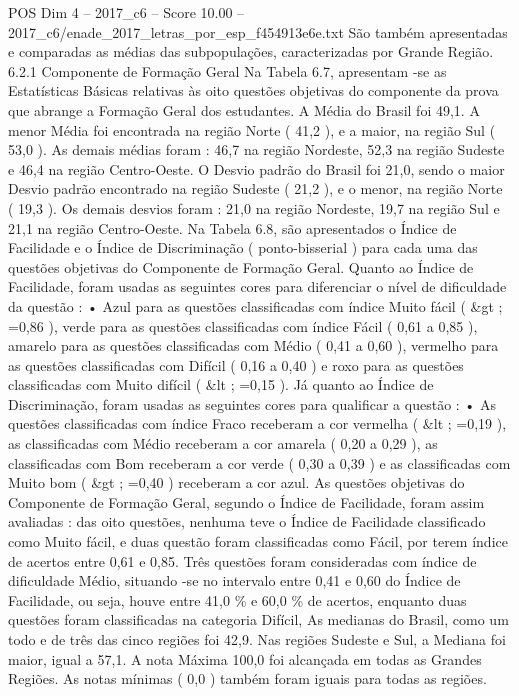 \begin{textsample}{POS Dim 4 – 2017\_c6 – Score 10.00 – 2017\_c6/enade\_2017\_letras\_por\_esp\_f454913e6e.txt}
São também apresentadas e comparadas as médias das subpopulações, caracterizadas por Grande Região. 6.2.1 Componente de Formação Geral Na Tabela 6.7, apresentam -se as Estatísticas Básicas relativas às oito questões objetivas do componente da prova que abrange a Formação Geral dos estudantes.
A Média do Brasil foi 49,1.
A menor Média foi encontrada na região Norte ( 41,2 ), e a maior, na região Sul ( 53,0 ).
As demais médias foram : 46,7 na região Nordeste, 52,3 na região Sudeste e 46,4 na região Centro-Oeste.
O Desvio padrão do Brasil foi 21,0, sendo o maior Desvio padrão encontrado na região Sudeste ( 21,2 ), e o menor, na região Norte ( 19,3 ).
Os demais desvios foram : 21,0 na região Nordeste, 19,7 na região Sul e 21,1 na região Centro-Oeste.
Na Tabela 6.8, são apresentados o Índice de Facilidade e o Índice de Discriminação ( ponto-bisserial ) para cada uma das questões objetivas do Componente de Formação Geral.
Quanto ao Índice de Facilidade, foram usadas as seguintes cores para diferenciar o nível de dificuldade da questão : • Azul para as questões classificadas com índice Muito fácil ( \&gt ; =0,86 ), verde para as questões classificadas com índice Fácil ( 0,61 a 0,85 ), amarelo para as questões classificadas com Médio ( 0,41 a 0,60 ), vermelho para as questões classificadas com Difícil ( 0,16 a 0,40 ) e roxo para as questões classificadas com Muito difícil ( \&lt ; =0,15 ).
Já quanto ao Índice de Discriminação, foram usadas as seguintes cores para qualificar a questão : • As questões classificadas com índice Fraco receberam a cor vermelha ( \&lt ; =0,19 ), as classificadas com Médio receberam a cor amarela ( 0,20 a 0,29 ), as classificadas com Bom receberam a cor verde ( 0,30 a 0,39 ) e as classificadas com Muito bom ( \&gt ; =0,40 ) receberam a cor azul.
As questões objetivas do Componente de Formação Geral, segundo o Índice de Facilidade, foram assim avaliadas : das oito questões, nenhuma teve o Índice de Facilidade classificado como Muito fácil, e duas questão foram classificadas como Fácil, por terem índice de acertos entre 0,61 e 0,85.
Três questões foram consideradas com índice de dificuldade Médio, situando -se no intervalo entre 0,41 e 0,60 do Índice de Facilidade, ou seja, houve entre 41,0 \% e 60,0 \% de acertos, enquanto duas questões foram classificadas na categoria Difícil, As medianas do Brasil, como um todo e de três das cinco regiões foi 42,9.
Nas regiões Sudeste e Sul, a Mediana foi maior, igual a 57,1.
A nota Máxima 100,0 foi alcançada em todas as Grandes Regiões.
As notas mínimas ( 0,0 ) também foram iguais para todas as regiões.

\end{textsample}
